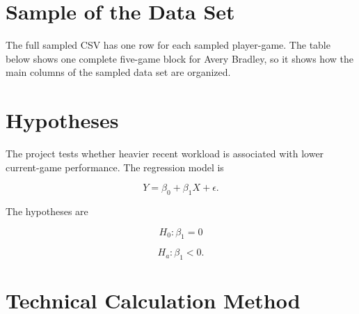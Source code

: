 \documentclass[12pt]{article}
\begin{document}
\section*{Sample of the Data Set}

The full sampled CSV has one row for each sampled player-game. The table below shows one complete five-game block for Avery Bradley, so it shows how the main columns of the sampled data set are organized.

\begin{table}[htbp]
\centering
\caption{Example of one sampled non-overlapping five-game block from the data set.}
\label{tab:one-player-sample}
\end{table}

\section*{Hypotheses}

The project tests whether heavier recent workload is associated with lower current-game performance. The regression model is

\[
Y = \beta_0 + \beta_1X + \epsilon.
\]

The hypotheses are

\[
H_0: \beta_1 = 0
\]

\[
H_a: \beta_1 < 0.
\]

\section*{Technical Calculation Method}
\end{document}
